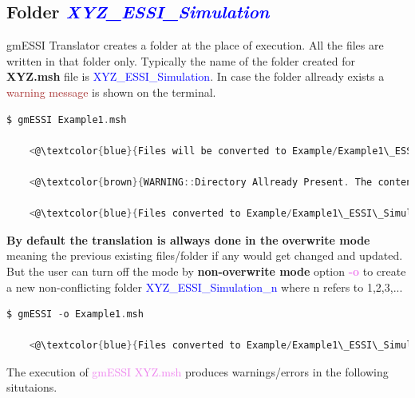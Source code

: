 \documentclass[11pt]{article}
\begin{document}
  \subsection{Folder \textcolor{blue}{\textit{XYZ\_ESSI\_Simulation}}}


    gmESSI Translator creates a folder at the place of execution. All the
    files are written in that folder only. Typically the name of the folder
    created for \textbf{XYZ.msh} file is
    \textcolor{blue}{XYZ\_ESSI\_Simulation}. In case the folder allready
    exists a \textcolor{brown}{warning message} is shown on the terminal.

    \begin{lstlisting}[language=C,backgroundcolor=\color{grayish}]
    $ gmESSI Example1.msh 

    <@\textcolor{blue}{Files will be converted to Example/Example1\_ESSI\_Simulation}@>  

    <@\textcolor{brown}{WARNING::Directory Allready Present. The contents of the Folder may get changed}@> 

    <@\textcolor{blue}{Files converted to Example/Example1\_ESSI\_Simulation}@>  
    \end{lstlisting}

    \textbf{By default the translation is allways done in the overwrite mode}
    meaning the previous existing files/folder if any would get changed and
    updated. But the user can turn off the mode by \textbf{non-overwrite
    mode} option \textcolor{violet}{\textbf{-o}} to create a new non-conflicting 
    folder \textcolor{blue}{XYZ\_ESSI\_Simulation\_n} where n
    refers to 1,2,3,...

    \begin{lstlisting}[language=C,backgroundcolor=\color{grayish}]
    $ gmESSI -o Example1.msh 

    <@\textcolor{blue}{Files converted to Example/Example1\_ESSI\_Simulation\_1}@>  
    \end{lstlisting}

      The execution of \textcolor{violet}{gmESSI XYZ.msh} produces warnings/errors in the following situtaions. 
\end{document}
